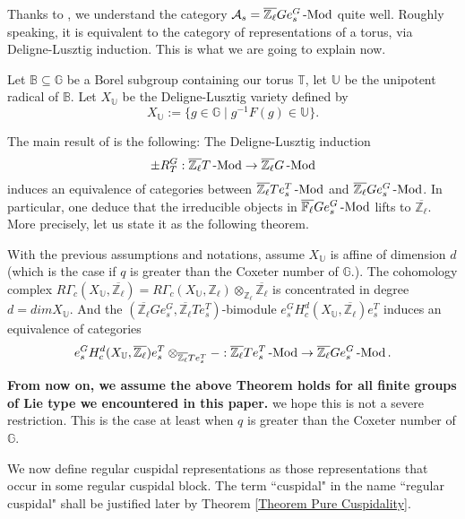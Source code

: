 	Thanks to \cite{broue1990isometries}, we understand the category $\mathcal{A}_s=\overline{\mathbb{Z}_\ell}Ge_s^G\operatorname{-Mod}$ quite well. Roughly speaking, it is equivalent to the category of representations of a torus, via Deligne-Lusztig induction. This is what we are going to explain now.
	
	Let $\mathbb{B} \subseteq \mathbb{G}$ be a Borel subgroup containing our torus $\mathbb{T}$, let $\mathbb{U}$ be the unipotent radical of $\mathbb{B}$. Let $X_{\mathbb{U}}$ be the Deligne-Lusztig variety defined by
	$$X_{\mathbb{U}}:=\{g \in \mathbb{G} \;|\; g^{-1}F(g) \in \mathbb{U}\}.$$
	
	The main result of \cite{broue1990isometries} is the following: The Deligne-Lusztig induction 
	$$\pm R_T^G: \overline{\mathbb{Z}_\ell}T\operatorname{-Mod} \to \overline{\mathbb{Z}_\ell}G\operatorname{-Mod}$$ induces an equivalence of categories between $\overline{\mathbb{Z}_\ell}Te_s^T\operatorname{-Mod}$ and $\overline{\mathbb{Z}_\ell}Ge_s^G\operatorname{-Mod}$. In particular, one deduce that the irreducible objects in $\overline{\mathbb{F}_\ell}Ge_s^G\operatorname{-Mod}$ lifts to $\overline{\mathbb{Z}_\ell}$. More precisely, let us state it as the following theorem.
	
	\begin{theorem}\label{Thm Broué}
		With the previous assumptions and notations, assume $X_{\mathbb{U}}$ is affine of dimension $d$ (which is the case if $q$ is greater than the Coxeter number of $\mathbb{G}$.). The cohomology complex $R\Gamma_c(X_{\mathbb{U}}, \overline{\mathbb{Z}_\ell})=R\Gamma_c(X_{\mathbb{U}}, {\mathbb{Z}_\ell}) \otimes_{\mathbb{Z}_\ell}$$\overline{\mathbb{Z}_\ell}$ is concentrated in degree $d=dimX_{\mathbb{U}}$. And the $(\overline{\mathbb{Z}_\ell}Ge_s^G, \overline{\mathbb{Z}_\ell}Te_s^T)$-bimodule $e_s^GH_c^d(X_{\mathbb{U}}, \overline{\mathbb{Z}_\ell})e_s^T$ induces an equivalence of categories
		$$e_s^GH_c^d(X_{\mathbb{U}}, \overline{\mathbb{Z}_\ell})e_s^T \otimes_{\overline{\mathbb{Z}_\ell}Te_s^T}-: \overline{\mathbb{Z}_\ell}Te_s^T\operatorname{-Mod} \to \overline{\mathbb{Z}_\ell}Ge_s^G\operatorname{-Mod}.$$
	\end{theorem}
	
	\textbf{From now on, we assume the above Theorem holds for all finite groups of Lie type we encountered in this paper.} we hope this is not a severe restriction. This is the case at least when $q$ is greater than the Coxeter number of $\mathbb{G}$.
	
	We now define regular cuspidal representations as those representations that occur in some regular cuspidal block. The term ``cuspidal" in the name ``regular cuspidal" shall be justified later by Theorem \ref{Theorem Pure Cuspidality}.
	
